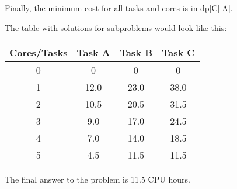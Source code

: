 \documentclass{article}
\begin{document}
Finally, the minimum cost for all tasks and cores is in dp[C][A].

The table with solutions for subproblems would look like this:

\begin{center}
    \begin{tabular}{|c||c|c|c|}
        \hline
        Cores/Tasks & Task A & Task B & Task C \\
        \hline\hline
        0 & 0 & 0 & 0 \\
        \hline
        1 & 12.0 & 23.0 & 38.0 \\
        \hline
        2 & 10.5 & 20.5 & 31.5 \\
        \hline
        3 & 9.0 & 17.0 & 24.5 \\
        \hline
        4 & 7.0 & 14.0 & 18.5 \\
        \hline
        5 & 4.5 & 11.5 & 11.5 \\
        \hline
    \end{tabular}
\end{center}

The final answer to the problem is 11.5 CPU hours.
\end{document}
